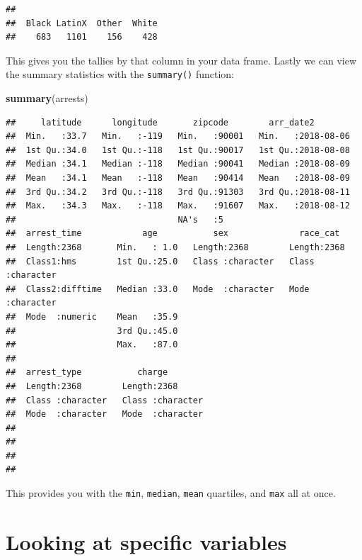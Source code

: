 \documentclass[]{book}
\newenvironment{Shaded}{\begin{snugshade}}{\end{snugshade}}
\newcommand{\KeywordTok}[1]{\textcolor[rgb]{0.13,0.29,0.53}{\textbf{#1}}}
\newcommand{\NormalTok}[1]{#1}
\begin{document}
\begin{verbatim}
## 
##  Black LatinX  Other  White 
##    683   1101    156    428
\end{verbatim}

This gives you the tallies by that column in your data frame. Lastly we can view the summary statistics with the \texttt{summary()} function:

\begin{Shaded}
\begin{Highlighting}[]
\KeywordTok{summary}\NormalTok{(arrests)}
\end{Highlighting}
\end{Shaded}

\begin{verbatim}
##     latitude      longitude       zipcode        arr_date2         
##  Min.   :33.7   Min.   :-119   Min.   :90001   Min.   :2018-08-06  
##  1st Qu.:34.0   1st Qu.:-118   1st Qu.:90017   1st Qu.:2018-08-08  
##  Median :34.1   Median :-118   Median :90041   Median :2018-08-09  
##  Mean   :34.1   Mean   :-118   Mean   :90414   Mean   :2018-08-09  
##  3rd Qu.:34.2   3rd Qu.:-118   3rd Qu.:91303   3rd Qu.:2018-08-11  
##  Max.   :34.3   Max.   :-118   Max.   :91607   Max.   :2018-08-12  
##                                NA's   :5                           
##  arrest_time            age           sex              race_cat        
##  Length:2368       Min.   : 1.0   Length:2368        Length:2368       
##  Class1:hms        1st Qu.:25.0   Class :character   Class :character  
##  Class2:difftime   Median :33.0   Mode  :character   Mode  :character  
##  Mode  :numeric    Mean   :35.9                                        
##                    3rd Qu.:45.0                                        
##                    Max.   :87.0                                        
##                                                                        
##  arrest_type           charge         
##  Length:2368        Length:2368       
##  Class :character   Class :character  
##  Mode  :character   Mode  :character  
##                                       
##                                       
##                                       
## 
\end{verbatim}

This provides you with the \texttt{min}, \texttt{median}, \texttt{mean} quartiles, and \texttt{max} all at once.

\hypertarget{looking-at-specific-variables}{%
\section{Looking at specific variables}\label{looking-at-specific-variables}}
\end{document}
